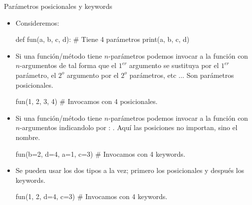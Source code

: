 \documentclass[10pt,envcountsect,spanish]{beamer}
\begin{document}
\begin{frame}[fragile]{Parámetros posicionales y keywords}

\begin{itemize} \small
\item Consideremos:
\begin{pyconsole}[][frame=single, fontsize=\small]
def fun(a, b, c, d):  # Tiene 4 parámetros
    print(a, b, c, d)

\end{pyconsole}
\item Si una función/método tiene $n$-parámetros podemos invocar a la función con $n$-argumentos de tal forma que el $1^{er}$ argumento se sustituya por el $1^{er}$ parámetro, el $2^{o}$ argumento por el $2^{o}$ parámetros, etc ... Son parámetros posicionales.

\begin{pyconsole}[][frame=single, fontsize=\small]
fun(1, 2, 3, 4) # Invocamos con 4 posicionales.

\end{pyconsole}

\item Si una función/método tiene $n$-parámetros podemos invocar a la función con $n$-argumentos indicandolo por : . Aquí las posiciones no importan, sino el nombre.

\begin{pyconsole}[][frame=single, fontsize=\small]
fun(b=2, d=4, a=1, c=3) # Invocamos con 4 keywords.

\end{pyconsole}

\item Se pueden usar los dos tipos a la vez;  primero los posicionales y después los keywords.
\begin{pyconsole}[][frame=single, fontsize=\small]
fun(1, 2, d=4, c=3) # Invocamos con 4 keywords.

\end{pyconsole}
\end{itemize}
\end{frame}
\end{document}
